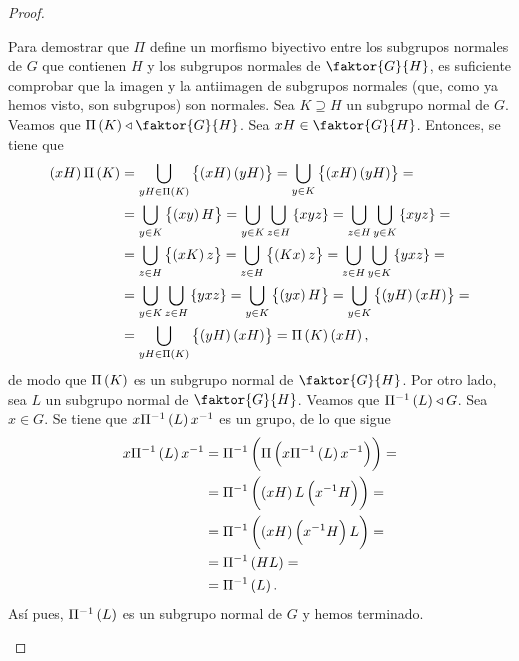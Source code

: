 \begin{proof}
\begin{enumerate}[i)]
            \noindent Para demostrar que $\Pi$ define un morfismo biyectivo entre los subgrupos normales de $G$ que contienen $H$ y los subgrupos normales de $\faktor{G}{H}$, es suficiente comprobar que la imagen y la antiimagen de subgrupos normales (que, como ya hemos visto, son subgrupos) son normales. Sea $K\supseteq H$ un subgrupo normal de $G$. Veamos que $\Pi\lp K\rp\triangleleft \faktor{G}{H}$. Sea $xH\in\faktor{G}{H}$. Entonces, se tiene que 
            \begin{align*}
                \left( xH\right) \Pi\left( K\right) &= \bigcup_{yH\in\Pi\left( K\right)}\left\{\left( xH\right)\left( yH\right)\right\} = \bigcup_{y\in K}\left\{\left( xH\right)\left( yH\right)\right\} =\\
                &= \bigcup_{y\in K}\left\{\left( xy\right) H\right\} = \bigcup_{y\in K}\bigcup_{z\in H}\left\{ xyz\right\} = \bigcup_{z\in H}\bigcup_{y\in K}\left\{ xyz\right\} =\\ 
                &= \bigcup_{z\in H}\left\{ \left( xK\right) z\right\} = \bigcup_{z\in H}\left\{ \left( Kx\right) z\right\} = \bigcup_{z\in H}\bigcup_{y\in K}\left\{ yxz\right\} =\\ 
                &= \bigcup_{y\in K}\bigcup_{z\in H}\left\{ yxz\right\} = \bigcup_{y\in K}\left\{\left( yx\right) H\right\} = \bigcup_{y\in K}\left\{\left( yH\right)\left( xH\right)\right\} =\\
                &= \bigcup_{yH\in \Pi\left( K\right)}\left\{\left( yH\right)\left( xH\right)\right\} = \Pi\left( K\right)\left( xH\right),
            \end{align*}    
	    de modo que $\Pi\left( K\right)$ es un subgrupo normal de $\faktor{G}{H}$. Por otro lado, sea $L$ un subgrupo normal de $\faktor{G}{H}$. Veamos que $\Pi^{-1}\left( L\right)\triangleleft G$. Sea $x\in G$. Se tiene que $x\Pi^{-1}\left( L\right) x^{-1}$ es un grupo, de lo que sigue
            \begin{align*}
                x\Pi^{-1}\left( L\right) x^{-1} &= \Pi^{-1}\left( \Pi\left( x\Pi^{-1}\left( L\right) x^{-1}\right)\right) =\\
                &=\Pi^{-1}\left( \left( xH\right) L \left( x^{-1}H\right)\right) =\\
                &=\Pi^{-1}\left( \left( xH\right) \left( x^{-1}H\right) L\right) =\\
                &=\Pi^{-1}\left( HL\right) =\\
                &=\Pi^{-1}\left( L\right).
            \end{align*}
            Así pues, $\Pi^{-1}\left( L\right)$ es un subgrupo normal de $G$ y hemos terminado.
    \end{enumerate}
\end{proof}

